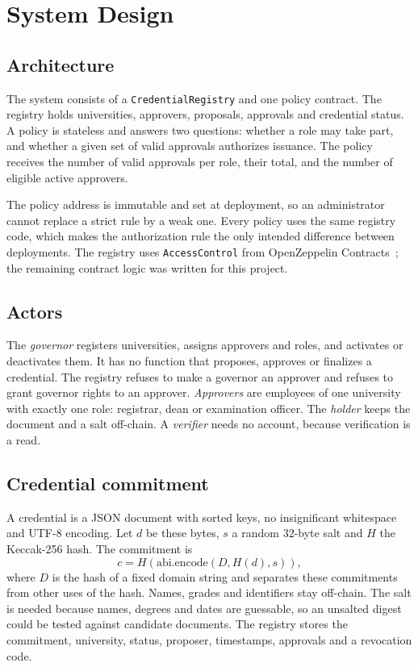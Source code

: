 \section{System Design}\label{sec:design}

\subsection{Architecture}
The system consists of a \texttt{CredentialRegistry} and one policy contract. The registry holds universities, approvers, proposals, approvals and credential status. A policy is stateless and answers two questions: whether a role may take part, and whether a given set of valid approvals authorizes issuance. The policy receives the number of valid approvals per role, their total, and the number of eligible active approvers.

The policy address is immutable and set at deployment, so an administrator cannot replace a strict rule by a weak one. Every policy uses the same registry code, which makes the authorization rule the only intended difference between deployments. The registry uses \texttt{AccessControl} from OpenZeppelin Contracts~\cite{openzeppelin2024,ozdocs}; the remaining contract logic was written for this project.

\subsection{Actors}
The \emph{governor} registers universities, assigns approvers and roles, and activates or deactivates them. It has no function that proposes, approves or finalizes a credential. The registry refuses to make a governor an approver and refuses to grant governor rights to an approver. \emph{Approvers} are employees of one university with exactly one role: registrar, dean or examination officer. The \emph{holder} keeps the document and a salt off-chain. A \emph{verifier} needs no account, because verification is a read.

\subsection{Credential commitment}
A credential is a JSON document with sorted keys, no insignificant whitespace and UTF-8 encoding. Let $d$ be these bytes, $s$ a random 32-byte salt and $H$ the Keccak-256 hash. The commitment is
\begin{equation}
c = H(\mathrm{abi.encode}(D, H(d), s)),
\end{equation}
where $D$ is the hash of a fixed domain string and separates these commitments from other uses of the hash. Names, grades and identifiers stay off-chain. The salt is needed because names, degrees and dates are guessable, so an unsalted digest could be tested against candidate documents. The registry stores the commitment, university, status, proposer, timestamps, approvals and a revocation code.

